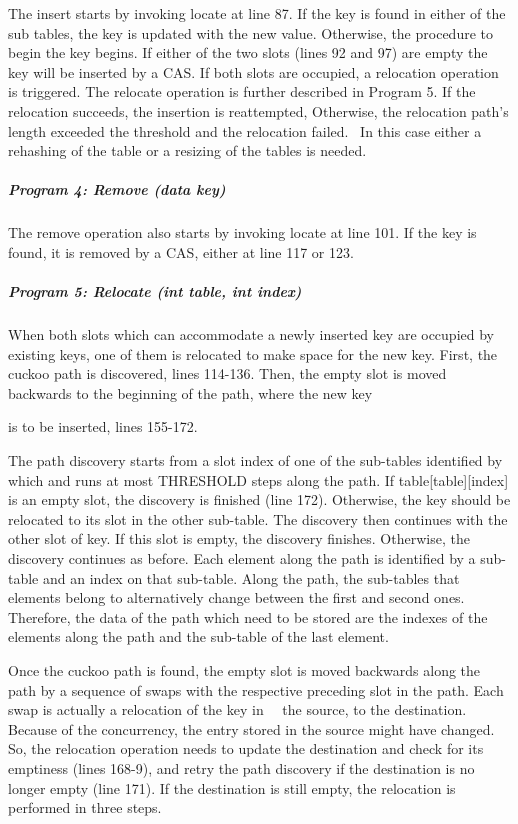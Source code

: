 \documentclass{article}
\begin{document}
\bigskip

The insert starts by invoking locate at line 87. If the key is found in either of the sub tables, the key is updated
with the new value. Otherwise, the procedure to begin the key begins. If either of the two slots (lines 92 and 97) are
empty the key will be inserted by a CAS. If both slots are occupied, a relocation operation is triggered. The relocate
operation is further described in Program 5. If the relocation succeeds, the insertion is reattempted, Otherwise, the
relocation path's length exceeded the threshold and the relocation failed. \ In this case either a rehashing of the
table or a resizing of the tables is needed.

\subparagraph{Program 4: Remove (data key)}

\bigskip

The remove operation also starts by invoking locate at line 101. If the key is found, it is removed by a CAS, either at
line 117 or 123.

\subparagraph{Program 5: Relocate (int table, int index)}

\bigskip

When both slots which can accommodate a newly inserted key are occupied by existing keys, one of them is relocated to
make space for the new key. First, the cuckoo path is discovered, lines 114-136. Then, the empty slot is moved
backwards to the beginning of the path, where the new key

is to be inserted, lines 155-172. 

The path discovery starts from a slot index of one of the sub-tables identified by which and runs at most THRESHOLD
steps along the path. If table[table][index] is an empty slot, the discovery is finished (line 172). Otherwise, the key
should be relocated to its slot in the other sub-table. The discovery then continues with the other slot of key. If
this slot is empty, the discovery finishes. Otherwise, the discovery continues as before. Each element along the path
is identified by a sub-table and an index on that sub-table. Along the path, the sub-tables that elements belong to
alternatively change between the first and second ones. Therefore, the data of the path which need to be stored are the
indexes of the elements along the path and the sub-table of the last element.

Once the cuckoo path is found, the empty slot is moved backwards along the path by a sequence of swaps with the
respective preceding slot in the path. Each swap is actually a relocation of the key in \ \ the source, to the
destination. Because of the concurrency, the entry stored in the source might have changed. So, the relocation
operation needs to update the destination and check for its emptiness (lines 168-9), and retry the path discovery if
the destination is no longer empty (line 171). If the destination is still empty, the relocation is performed in three
steps.
\end{document}
